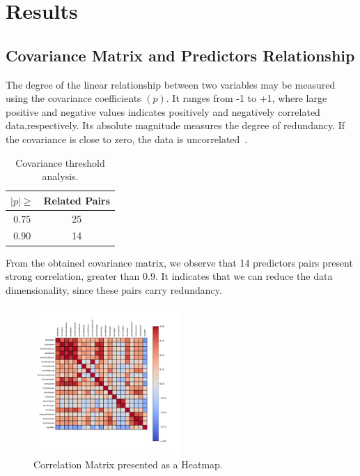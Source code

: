 
\section{Results}

\subsection{Covariance Matrix and Predictors Relationship}
The degree of the linear relationship between two variables may be measured using the covariance coefficients $(p)$. It ranges from -1 to +1, where large positive and negative values indicates positively and negatively correlated data,respectively. Its absolute magnitude measures the degree of redundancy. If the covariance is close to zero, the data is uncorrelated~\cite{Kuhn2013}.

\begin{table}[htbp]
  \caption{Covariance threshold analysis.}
  \begin{center}
  \begin{tabular}{|c|c|}
          \hline 
          $|p| \geq$ & Related Pairs\\
          \hline
          $0.75$ & 25\\
          \hline
          $0.90$ & 14 \\
          \hline
  \end{tabular}
\label{tab:Covariance}
\end{center}
\end{table}

From the obtained covariance matrix, we observe that 14 predictors pairs present strong correlation, greater than 0.9. It indicates that we can reduce the data dimensionality, since these pairs carry redundancy.

\begin{figure}[htbp!]
  \centerline{\includegraphics[width=0.5\textwidth]{../../code/hw2/figures/1-correlation_matrix.pdf}}
  \caption{Correlation Matrix presented as a Heatmap.}
  \label{fig:1-correlation_matrix}
\end{figure}

